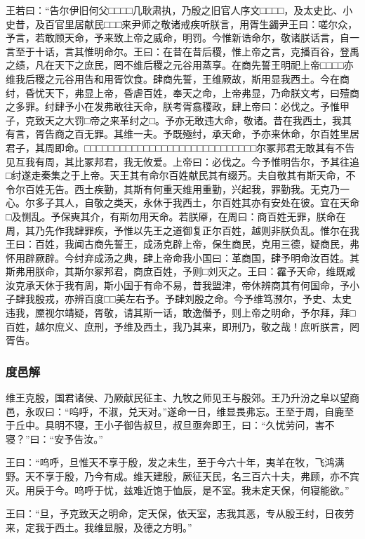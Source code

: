 \documentclass[]{article}
\begin{document}
王若曰：``告尔伊旧何父□□□□几耿肃执，乃殷之旧官人序文□□□□，及太史比、小史昔，及百官里居献民□□□来尹师之敬诸戒疾听朕言，用胥生蠲尹王曰：嗟尔众，予言，若敢顾天命，予来致上帝之威命，明罚。今惟新诰命尔，敬诸朕话言，自一言至于十话，言其惟明命尔。王曰：在昔在昔后稷，惟上帝之言，克播百谷，登禹之绩，凡在天下之庶民，罔不维后稷之元谷用蒸享。在商先誓王明祀上帝□□□□亦维我后稷之元谷用告和用胥饮食。肆商先誓，王维厥故，斯用显我西土。今在商纣，昏忧天下，弗显上帝，昏虐百姓，奉天之命，上帝弗显，乃命朕文考，曰殪商之多罪。纣肆予小在发弗敢往天命，朕考胥翕稷政，肆上帝曰：必伐之。予惟甲子，克致天之大罚□帝之来革纣之□。予亦无敢违大命，敬诸。昔在我西土，我其有言，胥告商之百无罪。其维一夫。予既殛纣，承天命，予亦来休命，尔百姓里居君子，其周即命。□□□□□□□□□□□□□□□□□□□□□□□□□□□□□尔冢邦君无敢其有不告见互我有周，其比冢邦君，我无攸爱。上帝曰：必伐之。今予惟明告尔，予其往追□纣遂走秦集之于上帝。天王其有命尔百姓献民其有缀艿。夫自敬其有斯天命，不令尔百姓无告。西土疾勤，其斯有何重天维用重勤，兴起我，罪勤我。无克乃一心。尔多子其人，自敬之类天，永休于我西土，尔百姓其亦有安处在彼。宜在天命□及恻乱。予保奭其介，有斯勿用天命。若朕厣，在周曰：商百姓无罪，朕命在周，其乃先作我肆罪疾，予惟以先王之道御复正尔百姓，越则非朕负乱。惟尔在我王曰：百姓，我闻古商先誓王，成汤克辟上帝，保生商民，克用三德，疑商民，弗怀用辟厥辟。今纣弃成汤之典，肆上帝命我小国曰：革商国，肆予明命汝百姓。其斯弗用朕命，其斯尔冢邦君，商庶百姓，予则□刘灭之。王曰：靃予天命，维既咸汝克承天休于我有周，斯小国于有命不易，昔我盟津，帝休辨商其有何国命，予小子肆我殷戎，亦辨百度□□美左右予。予肆刘殷之命。今予维笃滪尔，予史、太史违我，黡视尔靖疑，胥敬，请其斯一话，敢逸僭予，则上帝之明命，予尔拜，拜□百姓，越尔庶义、庶刑，予维及西土，我乃其来，即刑乃，敬之哉！庶听朕言，罔胥告。

\hypertarget{header-n239}{%
\subsubsection{度邑解}\label{header-n239}}

维王克殷，国君诸侯、乃厥献民征主、九牧之师见王与殷郊。王乃升汾之阜以望商邑，永叹曰：``呜呼，不淑，兑天对。''遂命一日，维显畏弗忘。王至于周，自鹿至于丘中。具明不寝，王小子御告叔旦，叔旦亟奔即王，曰：``久忧劳问，害不寝？''曰：``安予告汝。''

王曰：``呜呼，旦惟天不享于殷，发之未生，至于今六十年，夷羊在牧，飞鸿满野。天不享于殷，乃今有成。维天建殷，厥征天民，名三百六十夫，弗顾，亦不宾灭。用戾于今。呜呼于忧，兹难近饱于恤辰，是不室。我未定天保，何寝能欲。''

王曰：``旦，予克致天之明命，定天保，依天室，志我其恶，专从殷王纣，日夜劳来，定我于西土。我维显服，及德之方明。''
\end{document}
